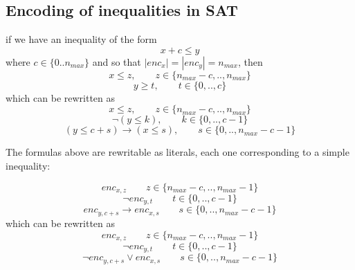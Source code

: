 \begin{bluebox}
\subsection{Encoding of inequalities in SAT}
if we have an inequality of the form 
$$x + c \leq y$$
where $c \in \{ 0..n_{max}\}$ and so that $|enc_{x}| = |enc_{y}|=n_{max}$, then 
$$x \leq z, \qquad z \in  \{ n_{max}-c, .., n_{max}\} $$
$$y \geq t, \qquad t \in  \{0, ..,c\}$$ 
which can be rewritten as 
$$x \leq z, \qquad z \in  \{ n_{max}-c, .., n_{max}\} $$
$$\neg (y \leq k), \qquad k \in \{0, .., c-1\}$$
$$(y \leq c + s) \rightarrow  (x \leq s), \qquad s \in \{0, .., n_{max} -c- 1\}$$

The formulas above are rewritable as literals, each one corresponding to a simple inequality:

$$enc_{x,z} \qquad z \in  \{ n_{max}-c, .., n_{max}-1\}$$
$$\neg enc_{y,t} \qquad t \in \{0, .., c-1\}$$
$$enc_{y,c+s} \rightarrow enc_{x,s} \qquad s \in \{ 0,.., n_{max}-c-1\}$$ 
which can be rewritten as 
$$enc_{x,z} \qquad z \in  \{ n_{max}-c, .., n_{max}-1\}$$
$$\neg enc_{y,t} \qquad t \in \{0, .., c-1\}$$
$$\neg enc_{y,c+s} \vee enc_{x,s} \qquad s \in \{ 0,.., n_{max}-c-1\}$$
\end{bluebox}

